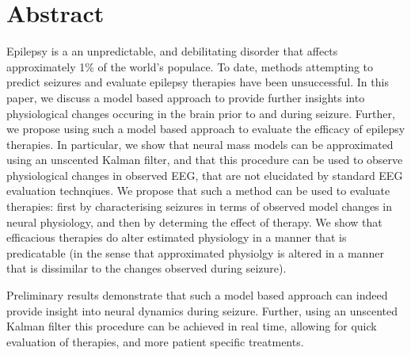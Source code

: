\section{Abstract}

Epilepsy is a an unpredictable, and debilitating disorder that affects approximately 1\% of the world's populace. To date, methods attempting to predict seizures and evaluate epilepsy therapies have been unsuccessful. In this paper, we discuss a model based approach to provide further insights into physiological changes occuring in the brain prior to and during seizure. Further, we propose using such a model based approach to evaluate the efficacy of epilepsy therapies. In particular, we show that neural mass models can be approximated using an unscented Kalman filter, and that this procedure can be used to observe physiological changes in observed EEG, that are not elucidated by standard EEG evaluation technqiues. We propose that such a method can be used to evaluate therapies: first by characterising seizures in terms of observed model changes in neural physiology, and then by determing the effect of therapy. We show that efficacious therapies do alter estimated physiology in a manner that is predicatable (in the sense that approximated physiolgy is altered in a manner that is dissimilar to the changes observed during seizure). 

Preliminary results demonstrate that such a model based approach can indeed provide insight into neural dynamics during seizure. Further, using an unscented Kalman filter this procedure can be achieved in real time, allowing for quick evaluation of therapies, and more patient specific treatments.